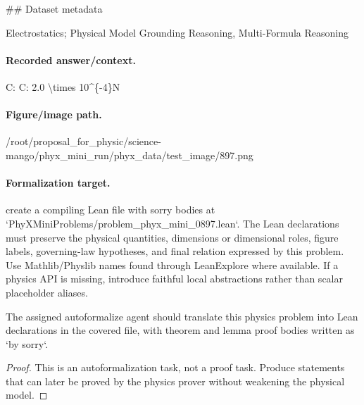 \#\# Dataset metadata

Electrostatics; Physical Model Grounding Reasoning, Multi-Formula Reasoning

\paragraph{Recorded answer/context.}
C: C: 2.0 \textbackslash{}times 10\textasciicircum{}\{-4\}N

\paragraph{Figure/image path.}
/root/proposal\_for\_physic/science-mango/phyx\_mini\_run/phyx\_data/test\_image/897.png

\paragraph{Formalization target.}
create a compiling Lean file with sorry bodies at `PhyXMiniProblems/problem\_phyx\_mini\_0897.lean`. The Lean declarations must preserve the physical quantities, dimensions or dimensional roles, figure labels, governing-law hypotheses, and final relation expressed by this problem.
Use Mathlib/Physlib names found through LeanExplore where available. If a physics API is missing, introduce faithful local abstractions rather than scalar placeholder aliases.

\begin{theorem}
\label{thm:physics:phyx_mini_0897:target}
The assigned autoformalize agent should translate this physics problem into Lean declarations in the covered file, with theorem and lemma proof bodies written as `by sorry`.
\end{theorem}
\begin{proof}
This is an autoformalization task, not a proof task. Produce statements that can later be proved by the physics prover without weakening the physical model.
\end{proof}

